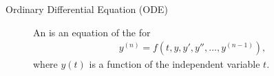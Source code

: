 \documentclass[letterpaper,10pt,english]{jupyterBook}
\begin{document}
\label{\detokenize{8_Appendices/8.0_Cheat_sheet:initial-value-problems}}\begin{description}
\item[{Ordinary Differential Equation (ODE)\label{\detokenize{8_Appendices/8.0_Cheat_sheet:term-Ordinary-Differential-Equation-ODE}}}] \leavevmode
\sphinxAtStartPar
An {\hyperref[\detokenize{1_IVPs/1.0_IVPs:ode-section}]{}} is an equation of the for
\begin{equation*}
\begin{split}y^{(n)} = f(t, y, y', y'', \ldots, y^{(n-1)}),\end{split}
\end{equation*}
\sphinxAtStartPar
where \(y(t)\) is a function of the independent variable \(t\).


\end{description}
\end{document}
